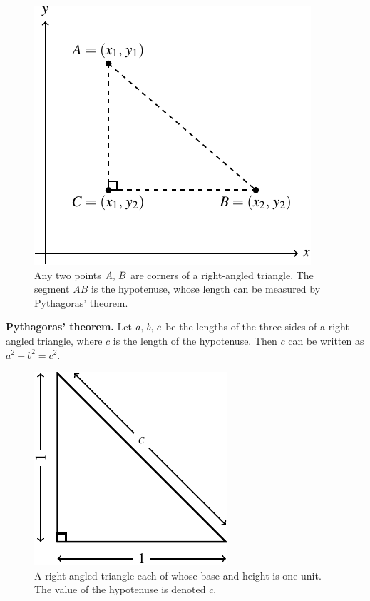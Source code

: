 \documentclass[a4paper,oneside,12pt]{article}
\begin{document}
\begin{figure}[!htbp]
\centering
\includegraphics[scale=1.1]{image/03/distance-two-points.pdf}
\caption{%
  Any two points ${A},\, {B}$ are corners of a right-angled triangle.
  The segment $AB$ is the hypotenuse, whose length can be measured by
  Pythagoras' theorem.
}
\label{fig:distance_between_two_points}
\end{figure}

\begin{theorem}
\textbf{Pythagoras' theorem.}
Let ${a},\, {b},\, {c}$ be the lengths of the three sides of a
right-angled triangle, where $c$ is the length of the hypotenuse.
Then $c$ can be written as $a^2 + b^2 = c^2$.
\end{theorem}

\begin{figure}[!htbp]
\centering
\includegraphics[scale=1.1]{image/03/triangle.pdf}
\caption{%
  A right-angled triangle each of whose base and height is one unit.
  The value of the hypotenuse is denoted $c$.
}
\label{fig:right_angled_triangle}
\end{figure}
\end{document}
